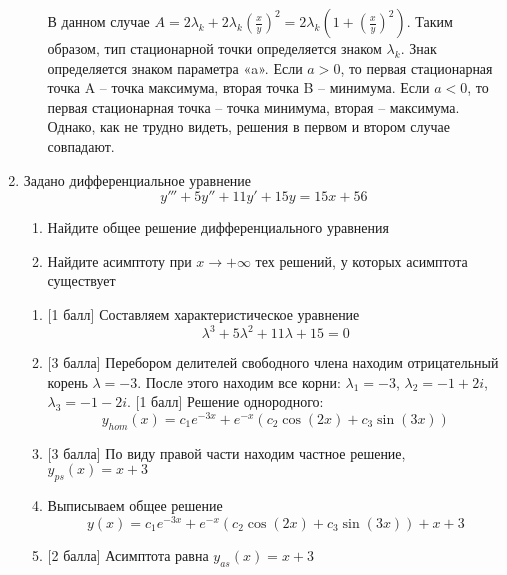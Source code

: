 \documentclass[pdftex,12pt,a4paper]{article}
\begin{document}
\begin{enumerate}
\begin{enumerate}
В данном случае $A=2\lambda _{k} +2\lambda _{k} \left(\frac{x}{y} \right)^{2} =2\lambda _{k} \left(1+\left(\frac{x}{y} \right)^{2} \right)$. Таким образом, тип стационарной точки определяется знаком $\lambda _{k} $. Знак определяется знаком параметра «a». Если $a>0$, то первая стационарная точка A -- точка максимума, вторая точка B -- минимума. Если $a<0$, то первая стационарная точка -- точка минимума, вторая -- максимума. Однако, как не трудно видеть, решения в первом и втором случае совпадают.

\end{enumerate}





\vspace{6pt}

\item Задано дифференциальное уравнение
 \[
 y'''+5y''+11y'+15y=15x+56
 \]
\begin{enumerate}
\item Найдите общее решение дифференциального уравнения
\item Найдите асимптоту при $x\to +\infty$ тех решений, у которых асимптота существует
\end{enumerate} 

\solution


\begin{enumerate}
\item $[$1 балл] Составляем характеристическое уравнение
\[
\lambda^3+5\lambda^2+11\lambda+15=0
\]
\item $[$3 балла]  Перебором делителей свободного члена находим отрицательный корень $\lambda=-3$. После этого находим все корни: $\lambda_1=-3$, $\lambda_2=-1+2i$, $\lambda_3=-1-2i$.
$[$1 балл]  Решение однородного:
\[
y_{hom}(x)=c_1e^{-3x}+e^{-x}(c_2\cos(2x)+c_3\sin(3x))
\]
\item $[$3 балла]  По виду правой части находим частное решение, $y_{ps}(x)=x+3$
\item Выписываем общее решение
\[
y(x)=c_1e^{-3x}+e^{-x}(c_2\cos(2x)+c_3\sin(3x))+x+3
\]
\item $[$2 балла]  Асимптота равна $y_{as}(x)=x+3$
\end{enumerate}



\end{enumerate}
\end{document}
